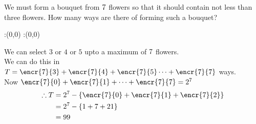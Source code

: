 



\question We must form a bouquet from $7$ flowers so that it should contain not less than three flowers. How many ways are there of forming such a bouquet?


\watchout

\ifprintanswers
  \begin{marginfigure}
      :(0,0)
      :(0,0)
    \figdrawbegin{}
      \figdrawline [100,101]
    \figdrawend
    \figvisu{\figBoxA}{}{%
    }
    \centerline{\box\figBoxA}
  \end{marginfigure}
\fi 

\begin{solution}
We can select $3$ or $4$ or $5$ upto a maximum of $7$ flowers.\\
We can do this in $T =  \encr{\vbone}{3} + \encr{\vbone}{4} + \encr{\vbone}{5} \cdots + \encr{\vbone}{\vbone}$ ways.\\
Now $\encr{\vbone}{0} + \encr{\vbone}{1} + \cdots + \encr{\vbone}{\vbone} = 2^{\vbone}$ \\
\begin{align}
\therefore T &= 2^{\vbone} - \lbrace \encr{\vbone}{0} + \encr{\vbone}{1} + \encr{\vbone}{2} \rbrace \\
&= 2^{\vbone} -\lbrace 1 + \vbone + \vbtwo \rbrace \\
&= \vbthree
\end{align}
 
 
\end{solution}


